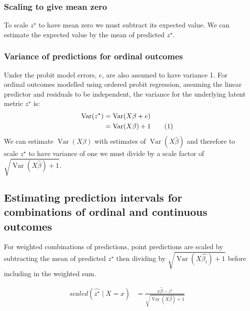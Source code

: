 \documentclass[12pt]{article}
\newcommand{\numberthis}{\addtocounter{equation}{1}\tag{\theequation}}
\newcommand{\Var}{\operatorname{Var}}
\begin{document}
\subsubsection{Scaling to give mean zero} %
\label{ssub:Scaling to give mean zero}
To scale \(z^\star\) to have mean zero we must subtract its expected value. We can estimate the expected value by the mean of predicted \(z^\star\).


\subsubsection{Variance of predictions for ordinal outcomes} %
\label{ssub:variance_of_predictions_for_ordinal_outcomes}
Under the probit model errors, \(e\), are also assumed to have variance 1. For ordinal outcomes modelled using ordered probit regression, assuming the linear predictor and residuals to be independent, the variance for the underlying latent metric \(z^\star\) is:
\begin{align*}
   \Var(z^\star) &= \Var(X\beta + e)  \\
                 &= \Var(X\beta) + 1 \numberthis \label{eq: var_y_star} 
\end{align*}
We can estimate \(\Var(X\beta)\) with estimates of \(\Var(X\hat{\beta})\)  and therefore to scale \(z^\star\) to have variance of one we must divide by a scale factor of \(\sqrt{\Var(X\hat{\beta}) + 1}\).




\subsection{Estimating prediction intervals for combinations of ordinal and continuous outcomes} %
\label{sub:estimating_prediction_intervals_for_combinations_of_ordinal_and_continuous_outcomes}
For weighted combinations of predictions, point predictions are scaled by subtracting the mean of predicted \(z^\star\) then dividing by \(\sqrt{\Var(X\hat{\beta_i}) + 1}\) before including in the weighted sum.

\begin{align*}
   scaled (\hat{z^\star}\mid X=x) &= \frac{x\hat{\beta} - \bar{z^\star}}{\sqrt{\Var(X\hat{\beta}) + 1}}    
\end{align*}
\end{document}
